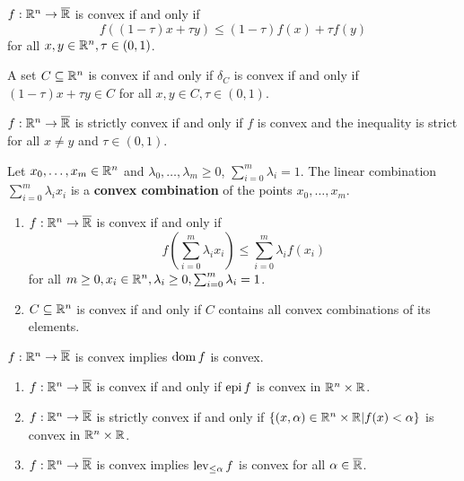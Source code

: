 \begin{defn}
  \label{sec:convexity-1}
  $f: \mathbb{R}^{n} \rightarrow \overline {\mathbb{R}}$ is convex if and only if
  \begin{equation}
    \label{eq:5}
    f((1 - \tau)x + \tau y) \leq (1 - \tau) f(x) + \tau f(y)
  \end{equation} for all $x, y \in \mathbb{R}^{n}, \tau \in (0, 1)$.

  A set $C \subseteq \mathbb{R}^{n}$ is convex if and only if $\delta_{C}$ is
  convex if and only if $(1 - \tau) x + \tau y \in C$ for all $x, y
  \in C, \tau \in (0, 1)$.

  $f: \mathbb{R}^{n} \rightarrow \overline {\mathbb{R}}$ is strictly convex if and only
  if $f$ is convex and the inequality is strict for all $x \neq y$ and
  $\tau \in (0, 1)$.
\end{defn}

\begin{defn}
  \label{sec:convexity-2}
  Let $x_{0}, \dots, x_{m} \in \mathbb{R}^{n}$  and $\lambda_{0}, \dots,
  \lambda_{m} \geq 0$, $\sum_{i=0}^{m} \lambda_{i} = 1$.  The linear
  combination $\sum_{i=0}^{m} \lambda_{i} x_{i}$ is a \textbf{convex
  combination} of the points $x_{0}, \dots, x_{m}$.
\end{defn}

\begin{thm}
  \label{sec:convexity-3}
  \begin{enumerate}
  \item $f: \mathbb{R}^{n} \rightarrow \overline {\mathbb{R}}$ is convex if and only if
    \begin{equation}
      \label{eq:6}
      f(\sum_{i=0}^{m} \lambda_{i} x_{i}) \leq \sum_{i=0}^{m}
      \lambda_{i} f(x_{i})
    \end{equation} for all $m \geq 0, x_{i} \in \mathbb{R}^{n}, \lambda_{i}
    \geq 0, \sum_{i=0}^{m} \lambda_{i} = 1$.
  \item $C \subseteq \mathbb{R}^{n}$ is convex if and only if $C$ contains all
    convex combinations of its elements.
  \end{enumerate}
\end{thm}

\begin{thm}
  \label{sec:convexity-4}
  $f: \mathbb{R}^{n} \rightarrow \overline {\mathbb{R}}$ is convex implies $\operatorname*{dom} f$ is convex.
\end{thm}

\begin{thm}
  \label{sec:convexity-5}
  \begin{enumerate}
  \item $f: \mathbb{R}^{n} \rightarrow \overline {\mathbb{R}}$ is convex if and only if
    $\operatorname*{epi} f$ is convex in $\mathbb{R}^{n} \times \mathbb{R}$.
  \item $f: \mathbb{R}^{n} \rightarrow \overline {\mathbb{R}}$ is strictly convex if and only if
    $\{ (x, \alpha) \in \mathbb{R}^{n} \times \mathbb{R} | f(x) < \alpha \} $ is
    convex in $\mathbb{R}^{n} \times \mathbb{R}$.
  \item $f: \mathbb{R}^{n} \rightarrow \overline {\mathbb{R}}$ is convex implies
    $\operatorname*{lev}_{\leq \alpha} f$ is convex for all $\alpha \in \overline {\mathbb{R}}$.
  \end{enumerate}
\end{thm}

